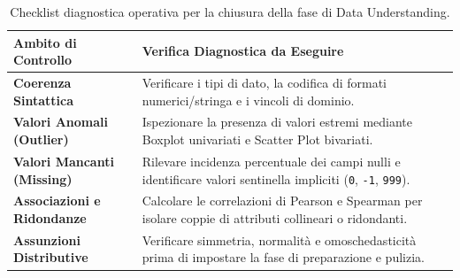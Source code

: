 \begin{table}[htbp]
    \centering
    \small
    \begin{tabularx}{\textwidth}{lX}
        \toprule
        \textbf{Ambito di Controllo} & \textbf{Verifica Diagnostica da Eseguire} \\
        \midrule
        \textbf{Coerenza Sintattica} & Verificare i tipi di dato, la codifica di formati numerici/stringa e i vincoli di dominio. \\
        \textbf{Valori Anomali (Outlier)} & Ispezionare la presenza di valori estremi mediante Boxplot univariati e Scatter Plot bivariati. \\
        \textbf{Valori Mancanti (Missing)} & Rilevare incidenza percentuale dei campi nulli e identificare valori sentinella impliciti (\texttt{0}, \texttt{-1}, \texttt{999}). \\
        \textbf{Associazioni e Ridondanze} & Calcolare le correlazioni di Pearson e Spearman per isolare coppie di attributi collineari o ridondanti. \\
        \textbf{Assunzioni Distributive} & Verificare simmetria, normalità e omoschedasticità prima di impostare la fase di preparazione e pulizia. \\
        \bottomrule
    \end{tabularx}
    \caption{Checklist diagnostica operativa per la chiusura della fase di Data Understanding.}
    \label{tab:dm-du-checklist}
\end{table}
